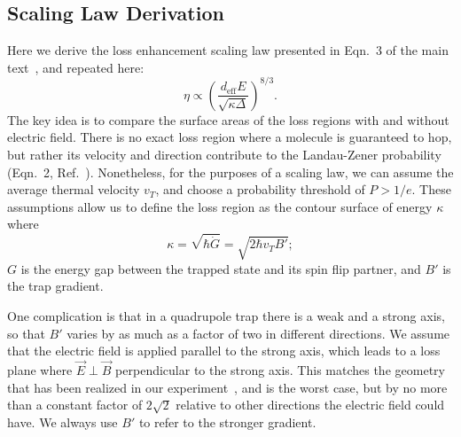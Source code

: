 \documentclass[%
 reprint,
 amsmath,amssymb,
 aps,
pra,
]{revtex4-1}
\begin{document}
\subsection{Scaling Law Derivation\label{sec:der}}

Here we derive the loss enhancement scaling law presented in Eqn.~3 of the main text~\cite{smt}, and repeated here:
\begin{equation}
\eta\propto \left(\frac{d_\text{eff}E}{\sqrt{\kappa\Delta}}\right)^{8/3}.
\end{equation}
The key idea is to compare the surface areas of the loss regions with and without electric field. 
There is no exact loss region where a molecule is guaranteed to hop, but rather its velocity and direction contribute to the Landau-Zener probability (Eqn.~2, Ref.~\cite{smt}).
Nonetheless, for the purposes of a scaling law, we can assume the average thermal velocity $v_T$, and choose a probability threshold of $P>1/e$.
These assumptions allow us to define the loss region as the contour surface of energy $\kappa$ where 
\begin{equation}
\kappa=\sqrt{\hbar\dot{G}}=\sqrt{2\hbar v_T B'};
\end{equation} 
$G$ is the energy gap between the trapped state and its spin flip partner, and $B'$ is the trap gradient.

One complication is that in a quadrupole trap there is a weak and a strong axis, so that $B'$ varies by as much as a factor of two in different directions.
We assume that the electric field is applied parallel to the strong axis, which leads to a loss plane where $\vec{E}\perp\vec{B}$ perpendicular to the strong axis. 
This matches the geometry that has been realized in our experiment~\cite{Stuhl2013}, and is the worst case, but by no more than a constant factor of $2\sqrt{2}$ relative to other directions the electric field could have.
We always use $B'$ to refer to the stronger gradient.
\end{document}
